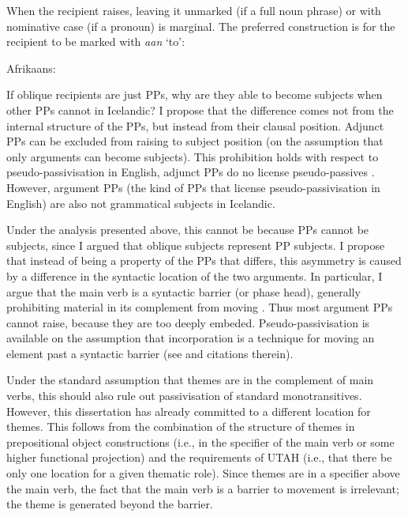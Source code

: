 When the recipient raises, leaving it unmarked (if a full noun phrase) or with nominative case (if a pronoun) is marginal. The preferred construction is for the recipient to be marked with \emph{aan} `to':

\begin{exe}
	\ex Afrikaans: \label{ex:af-rec-pass2}
\begin{xlist}
\end{xlist}
\end{exe}

If oblique recipients are just PPs, why are they able to become subjects when other PPs cannot in Icelandic? I propose that the difference comes not from the internal structure of the PPs, but instead from their clausal position. Adjunct PPs can be excluded from raising to subject position (on the assumption that only arguments can become subjects). This prohibition holds with respect to pseudo-passivisation in English, adjunct PPs do no license pseudo-passives \citep{Hornstein.1981,Baker.1988}. However, argument PPs (the kind of PPs that license pseudo-passivisation in English) are also not grammatical subjects in Icelandic.

Under the analysis presented above, this cannot be because PPs cannot be subjects, since I argued that oblique subjects represent PP subjects. I propose that instead of being a property of the PPs that differs, this asymmetry is caused by a difference in the syntactic location of the two arguments. In particular, I argue that the main verb is a syntactic barrier (or phase head), generally prohibiting material in its complement from moving \citep{Chomsky.2001}. Thus most argument PPs cannot raise, because they are too deeply embeded. Pseudo-passivisation is available on the assumption that incorporation is a technique for moving an element past a syntactic barrier (see \citealt{Alexiadou.2013b} and citations therein). 

Under the standard assumption that themes are in the complement of main verbs, this should also rule out passivisation of standard monotransitives. However, this dissertation has already committed to a different location for themes. This follows from the combination of the structure of themes in prepositional object constructions (i.e., in the specifier of the main verb or some higher functional projection) and the requirements of UTAH (i.e., that there be only one location for a given thematic role). Since themes are in a specifier above the main verb, the fact that the main verb is a barrier to movement is irrelevant; the theme is generated beyond the barrier.

